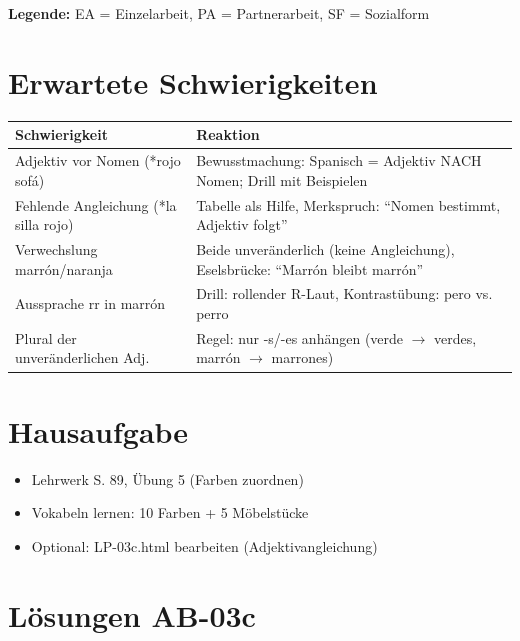 \documentclass[11pt,a4paper]{article}
\begin{document}
\textbf{Legende:} EA = Einzelarbeit, PA = Partnerarbeit, SF = Sozialform

\section{Erwartete Schwierigkeiten}

\begin{tabular}{|p{5cm}|p{8cm}|}
\hline
\textbf{Schwierigkeit} & \textbf{Reaktion} \\
\hline
Adjektiv vor Nomen (*rojo sofá) & Bewusstmachung: Spanisch = Adjektiv NACH Nomen; Drill mit Beispielen \\
\hline
Fehlende Angleichung (*la silla rojo) & Tabelle als Hilfe, Merkspruch: ``Nomen bestimmt, Adjektiv folgt'' \\
\hline
Verwechslung marrón/naranja & Beide unveränderlich (keine Angleichung), Eselsbrücke: ``Marrón bleibt marrón'' \\
\hline
Aussprache rr in marrón & Drill: rollender R-Laut, Kontrastübung: pero vs. perro \\
\hline
Plural der unveränderlichen Adj. & Regel: nur -s/-es anhängen (verde $\rightarrow$ verdes, marrón $\rightarrow$ marrones) \\
\hline
\end{tabular}

\section{Hausaufgabe}

\begin{itemize}
    \item Lehrwerk S. 89, Übung 5 (Farben zuordnen)
    \item Vokabeln lernen: 10 Farben + 5 Möbelstücke
    \item Optional: LP-03c.html bearbeiten (Adjektivangleichung)
\end{itemize}

\section{Lösungen AB-03c}
\end{document}
